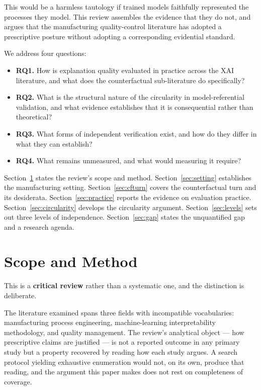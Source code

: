 \documentclass[11pt,a4paper]{article}
\begin{document}
This would be a harmless tautology if trained models faithfully represented the processes they model. This review assembles the evidence that they do not, and argues that the manufacturing quality-control literature has adopted a prescriptive posture without adopting a corresponding evidential standard.

We address four questions:

\begin{itemize}
\item \textbf{RQ1.} How is explanation quality evaluated in practice across the XAI literature, and what does the counterfactual sub-literature do specifically?
\item \textbf{RQ2.} What is the structural nature of the circularity in model-referential validation, and what evidence establishes that it is consequential rather than theoretical?
\item \textbf{RQ3.} What forms of independent verification exist, and how do they differ in what they can establish?
\item \textbf{RQ4.} What remains unmeasured, and what would measuring it require?
\end{itemize}

Section~\ref{sec:scope} states the review's scope and method. Section~\ref{sec:setting} establishes the manufacturing setting. Section~\ref{sec:cfturn} covers the counterfactual turn and its desiderata. Section~\ref{sec:practice} reports the evidence on evaluation practice. Section~\ref{sec:circularity} develops the circularity argument. Section~\ref{sec:levels} sets out three levels of independence. Section~\ref{sec:gap} states the unquantified gap and a research agenda.

\section{Scope and Method}\label{sec:scope}

This is a \textbf{critical review} rather than a systematic one, and the distinction is deliberate.

The literature examined spans three fields with incompatible vocabularies: manufacturing process engineering, machine-learning interpretability methodology, and quality management. The review's analytical object --- how prescriptive claims are justified --- is not a reported outcome in any primary study but a property recovered by reading how each study argues. A search protocol yielding exhaustive enumeration would not, on its own, produce that reading, and the argument this paper makes does not rest on completeness of coverage.
\end{document}
